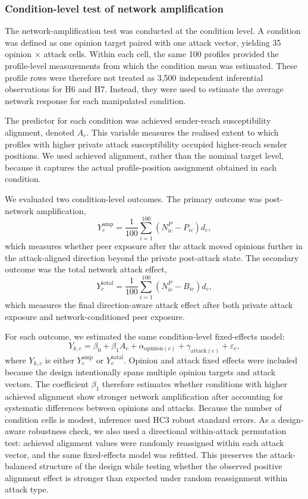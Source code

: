 \documentclass[11pt,a4paper]{article}
\begin{document}
\subsubsection{Condition-level test of network amplification}

The network-amplification test was conducted at the condition level. A condition was defined as
one opinion target paired with one attack vector, yielding 35 opinion $\times$ attack cells. Within
each cell, the same 100 profiles provided the profile-level measurements from which the condition
mean was estimated. These profile rows were therefore not treated as 3,500 independent inferential
observations for H6 and H7. Instead, they were used to estimate the average network response for
each manipulated condition.

The predictor for each condition was achieved sender-reach susceptibility alignment, denoted
\(A_c\). This variable measures the realised extent to which profiles with higher private attack
susceptibility occupied higher-reach sender positions. We used achieved alignment, rather than the
nominal target level, because it captures the actual profile-position assignment obtained in each
condition.

We evaluated two condition-level outcomes. The primary outcome was post-network amplification,
\begin{equation}
Y^{\mathrm{amp}}_c = \frac{1}{100}\sum_{i=1}^{100}(N^P_{ic}-P_{ic})d_c ,
\end{equation}
which measures whether peer exposure after the attack moved opinions further in the attack-aligned
direction beyond the private post-attack state. The secondary outcome was the total network attack
effect,
\begin{equation}
Y^{\mathrm{total}}_c = \frac{1}{100}\sum_{i=1}^{100}(N^P_{ic}-B_{ic})d_c ,
\end{equation}
which measures the final direction-aware attack effect after both private attack exposure and
network-conditioned peer exposure.

For each outcome, we estimated the same condition-level fixed-effects model:
\begin{equation}
Y_{k,c} = \beta_0 + \beta_1 A_c + \alpha_{\mathrm{opinion}(c)}
 + \gamma_{\mathrm{attack}(c)} + \varepsilon_c ,
\end{equation}
where \(Y_{k,c}\) is either \(Y^{\mathrm{amp}}_c\) or \(Y^{\mathrm{total}}_c\). Opinion and attack
fixed effects were included because the design intentionally spans multiple opinion targets and
attack vectors. The coefficient \(\beta_1\) therefore estimates whether conditions with higher
achieved alignment show stronger network amplification after accounting for systematic differences
between opinions and attacks. Because the number of condition cells is modest, inference used HC3
robust standard errors. As a design-aware robustness check, we also used a directional
within-attack permutation test: achieved alignment values were randomly reassigned within each
attack vector, and the same fixed-effects model was refitted. This preserves the attack-balanced
structure of the design while testing whether the observed positive alignment effect is stronger
than expected under random reassignment within attack type.
\end{document}
